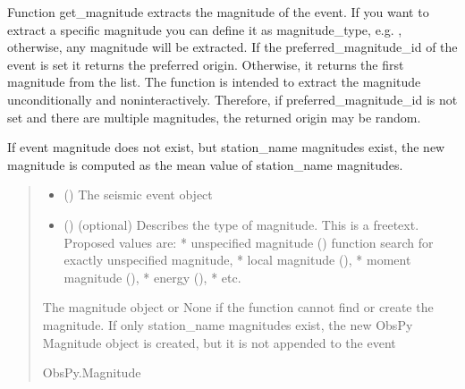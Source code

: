 \documentclass[letterpaper,10pt,english]{sphinxmanual}
\begin{document}
\begin{fulllineitems}
\label{\detokenize{api_core:amw.core.utils.get_magnitude}}
\pysigstartsignatures
{}
\pysigstopsignatures
\sphinxAtStartPar
Function get\_magnitude extracts the magnitude of the event.
If you want to extract a specific magnitude you can define it as magnitude\_type,
e.g. , otherwise, any magnitude will be extracted.
If the preferred\_magnitude\_id of the event is set it returns the preferred origin.
Otherwise, it returns the first magnitude from the list.
The function is intended to extract the magnitude unconditionally and non\sphinxhyphen{}interactively.
Therefore, if preferred\_magnitude\_id is not set and there are multiple magnitudes,
the returned origin may be random.

\sphinxAtStartPar
If event magnitude does not exist, but station\_name magnitudes exist, the new magnitude is computed
as the mean value of station\_name magnitudes.
\begin{quote}\begin{description}
\begin{itemize}
\item {} 
\sphinxAtStartPar
{} () \textendash{} The seismic event object

\item {} 
\sphinxAtStartPar
{} () \textendash{} (optional)
Describes the type of magnitude. This is a free\sphinxhyphen{}text. Proposed values are:
* unspecified magnitude () \sphinxhyphen{} function search for exactly unspecified magnitude,
* local magnitude (),
* moment magnitude (),
* energy (),
* etc.

\end{itemize}

\sphinxAtStartPar
The magnitude object or None if the function cannot find or create the magnitude.
If only station\_name magnitudes exist, the new ObsPy Magnitude object is created,
but it is not appended to the event

\sphinxAtStartPar
ObsPy.Magnitude

\end{description}\end{quote}

\end{fulllineitems}
\end{document}
